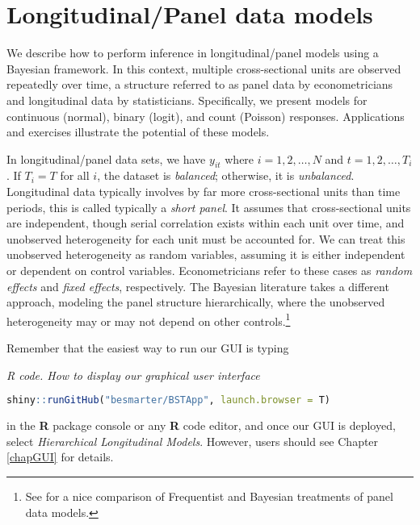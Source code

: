 \chapter{Longitudinal/Panel data models}\label{chap9}

We describe how to perform inference in longitudinal/panel models using a Bayesian framework. In this context, multiple cross-sectional units are observed repeatedly over time, a structure referred to as panel data by econometricians and longitudinal data by statisticians. Specifically, we present models for continuous (normal), binary (logit), and count (Poisson) responses. Applications and exercises illustrate the potential of these models.

In longitudinal/panel data sets, we have $y_{it}$ where $i=1,2,\dots,N$ and $t=1,2,\dots,T_i$. If $T_i=T$ for all $i$, the dataset is \textit{balanced}; otherwise, it is \textit{unbalanced}. Longitudinal data typically involves by far more cross-sectional units than time periods, this is called typically a \textit{short panel}. It assumes that cross-sectional units are independent, though serial correlation exists within each unit over time, and unobserved heterogeneity for each unit must be accounted for. We can treat this unobserved heterogeneity as random variables, assuming it is either independent or dependent on control variables. Econometricians refer to these cases as \textit{random effects} and \textit{fixed effects}, respectively. The Bayesian literature takes a different approach, modeling the panel structure hierarchically, where the unobserved heterogeneity may or may not depend on other controls.\footnote{See \cite{rendon2013fixed} for a nice comparison of Frequentist and Bayesian treatments of panel data models.}

Remember that the easiest way to run our GUI is typing

\begin{tcolorbox}[enhanced,width=4.67in,center upper,
	fontupper=\large\bfseries,drop shadow southwest,sharp corners]
	\textit{R code. How to display our graphical user interface}
	\begin{VF}
	\begin{lstlisting}[language=R]
	shiny::runGitHub("besmarter/BSTApp", launch.browser = T)\end{lstlisting}
	\end{VF}
\end{tcolorbox} 

in the \textbf{R} package console or any \textbf{R} code editor, and once our GUI is deployed, select \textit{Hierarchical Longitudinal Models}. However, users should see Chapter \ref{chapGUI} for details.

